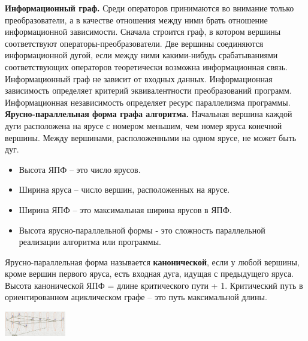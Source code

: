 \textbf{Информационный граф.} Среди операторов принимаются во внимание только преобразователи, а в качестве отношения между ними брать отношение информационной зависимости. Сначала строится граф, в котором вершины соответствуют операторы-преобразователи. Две вершины соединяются информационной дугой, если между ними какими-нибудь срабатываниями соответствующих операторов теоретически возможна информационная связь. Информационный граф не зависит от входных данных. Информационная зависимость определяет критерий эквивалентности преобразований программ.
Информационная независимость определяет ресурс параллелизма программы.\\

\textbf{Ярусно-параллельная форма графа алгоритма.}
Начальная вершина каждой дуги расположена на ярусе с номером меньшим, чем номер яруса конечной вершины. Между вершинами, расположенными на одном ярусе, не может быть дуг.\\
\begin{itemize}
    \item Высота ЯПФ – это число ярусов.
    \item Ширина яруса – число вершин, расположенных на ярусе.
    \item Ширина ЯПФ – это максимальная ширина ярусов в ЯПФ.
    \item Высота ярусно-параллельной формы - это сложность параллельной реализации алгоритма или программы.
\end{itemize}

Ярусно-параллельная форма называется \textbf{канонической}, если у любой вершины, кроме вершин первого яруса, есть входная дуга, идущая с предыдущего яруса.\\
Высота канонической ЯПФ = длине критического пути + 1. Критический путь в ориентированном ациклическом графе – это путь максимальной длины.
\begin{center}
\includegraphics[width=0.2\textwidth]{pics/layered-graph-algo.png}
\end{center}

